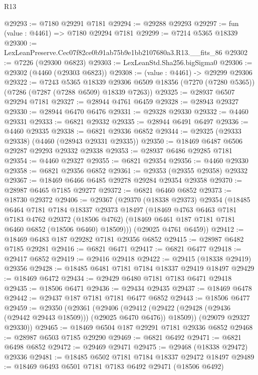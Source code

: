 \begin{lexlean}{R13}
\begin{coremodule}
@29293 := @7180 @29291 @7181
@29294 := @29288 @29293
@29297 := fun (value : @4461) => @7180 @29294 @7181
@29299 := @7214 @5365 @18339
@29300 := LexLeanPreserve.Cec07f82ce0b91ab75b9e1bb2107680a3.R13.__fits_86
@29302 := @7226 (@29300 @6823)
@29303 := LexLeanStd.Sha256.bigSigma0
@29306 := @29302 (@4460 (@29303 @6823))
@29308 := (value : @4461) -> @29299 @29306
@29322 := @7243
    @5365
    @18339
    @29306
    @6509
    @18356
    (@7270 (@7280 @5365))
    (@7286 (@7287 (@7288 @6509) @18339 @7263))
@29325 := @28937 @6507 @29294 @7181
@29327 := @28944 @4761 @6459
@29328 := @28943 @29327
@29330 := @28944 @6470 @6476
@29331 := @29328 @29330
@29332 := @4460 @29331
@29333 := @6821 @29332
@29335 := @28944 @6491 @6497
@29336 := @4460 @29335
@29338 := @6821 @29336 @6852
@29344 := @29325 (@29333 @29338) (@4460 (@28943 @29331 @29335))
@29350 := @18469 @6487 @6506 @29287 @29293 @29332 @29338
@29353 := @28937 @6486 @29285 @7181
@29354 := @4460 @29327
@29355 := @6821 @29354
@29356 := @4460 @29330
@29358 := @6821 @29356 @6852
@29361 := @29353 (@29355 @29358) @29332
@29367 := @18469 @6466 @6485 @29278 @29284 @29354 @29358
@29370 := @28987 @6465 @7185 @29277
@29372 := @6821 @6460 @6852
@29373 := @18730 @29372
@29406 := @29367
    (@29370
      (@18338 @29373)
      @29354
      (@18485
        @6464
        @7181
        @7184
        @18337
        @29373
        @18497
        (@18469
          @4763
          @6463
          @7181
          @7183
          @4762
          @29372
          (@18506 @4762)
          (@18469 @6461 @187 @7181 @7181 @6460 @6852 (@18506 @6460) @18509)))
      (@29025 @4761 @6459))
@29412 := @18469 @6483 @187 @29282 @7181 @29356 @6852
@29415 := @28987 @6482 @7185 @29281
@29416 := @6821 @6471
@29417 := @6821 @6477
@29418 := @29417 @6852
@29419 := @29416 @29418
@29422 := @29415 (@18338 @29419) @29356
@29428 := @18485 @6481 @7181 @7184 @18337 @29419 @18497
@29429 := @18469 @6472
@29434 := @29429 @6480 @7181 @7183 @6471 @29418
@29435 := @18506 @6471
@29436 := @29434 @29435
@29437 := @18469 @6478
@29442 := @29437 @187 @7181 @7181 @6477 @6852
@29443 := @18506 @6477
@29459 := @29350
    (@29361
      (@29406
        (@29412 (@29422 (@29428 (@29436 (@29442 @29443 @18509))) (@29025 @6470 @6476)) @18509))
      (@29079 @29327 @29330))
@29465 := @18469 @6504 @187 @29291 @7181 @29336 @6852
@29468 := @28987 @6503 @7185 @29290
@29469 := @6821 @6492
@29471 := @6821 @6498 @6852
@29472 := @29469 @29471
@29475 := @29468 (@18338 @29472) @29336
@29481 := @18485 @6502 @7181 @7184 @18337 @29472 @18497
@29489 := @18469 @6493 @6501 @7181 @7183 @6492 @29471 (@18506 @6492)

\end{coremodule}
\end{lexlean}
